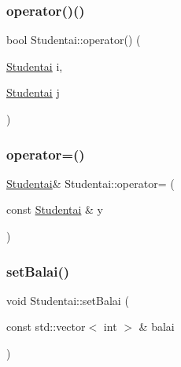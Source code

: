 \subsubsection{\texorpdfstring{operator()()}{operator()()}}
{\footnotesize\ttfamily bool Studentai\+::operator() (\begin{DoxyParamCaption}\item[{\mbox{\hyperlink{class_studentai}{Studentai}}}]{i,  }\item[{\mbox{\hyperlink{class_studentai}{Studentai}}}]{j }\end{DoxyParamCaption})\hspace{0.3cm}{\ttfamily [inline]}}

\mbox{\label{class_studentai_a4e417cb00bc644821af2ccb5739ae1b5}} 
\subsubsection{\texorpdfstring{operator=()}{operator=()}}
{\footnotesize\ttfamily \mbox{\hyperlink{class_studentai}{Studentai}}\& Studentai\+::operator= (\begin{DoxyParamCaption}\item[{const \mbox{\hyperlink{class_studentai}{Studentai}} \&}]{y }\end{DoxyParamCaption})\hspace{0.3cm}{\ttfamily [inline]}}

\mbox{\label{class_studentai_a5508e26d1f2cbb529d3d2a75f0fa84ff}} 
\subsubsection{\texorpdfstring{setBalai()}{setBalai()}}
{\footnotesize\ttfamily void Studentai\+::set\+Balai (\begin{DoxyParamCaption}\item[{const std\+::vector$<$ int $>$ \&}]{balai }\end{DoxyParamCaption})\hspace{0.3cm}{\ttfamily [inline]}}

\mbox{\label{class_studentai_a8cf46871b941c809c8527fc6dcacd407}} 
